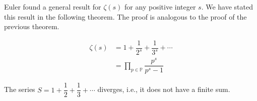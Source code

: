\documentclass{subfiles}
\begin{document}
	Euler found a general result for $\zeta(s)$ for any positive integer $s$. We have stated this result in the following theorem. The proof is analogous to the proof of the previous theorem.
		\begin{theorem}
			\begin{align*}
				\zeta(s)
					& =1+\dfrac{1}{2^s}+\dfrac{1}{3^s}+\cdots\\
					& =\prod_{p\in\mathbb{P} }\dfrac{p^s}{p^s-1}
			\end{align*}
		\end{theorem}

		\begin{theorem}
			The series $S=1+\dfrac{1}{2}+\dfrac{1}{3}+\cdots$ diverges, i.e., it does not have a finite sum.\label{thm:zeta1div}
		\end{theorem}
\end{document}
